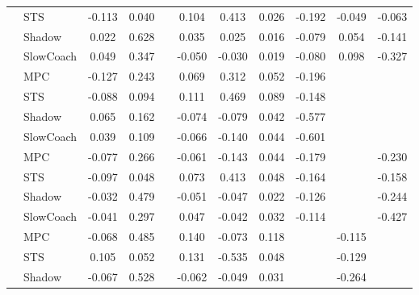\begin{tabular}{|l|l|*{9}{c|}}
                                                           & STS &   -0.113 &     0.040 &        &  0.104 &  0.413 &  0.026 &  -0.192 &  -0.049 &   -0.063 \\
                                                           & Shadow &    0.022 &     0.628 &        &  0.035 &  0.025 &  0.016 &  -0.079 &   0.054 &   -0.141 \\
                                                           & SlowCoach &    0.049 &     0.347 &        & -0.050 & -0.030 &  0.019 &  -0.080 &   0.098 &   -0.327 \\
\midrule
[True, True, False, True, True, True, True, False, False] & MPC &   -0.127 &     0.243 &        &  0.069 &  0.312 &  0.052 &  -0.196 &      &       \\
                                                           & STS &   -0.088 &     0.094 &        &  0.111 &  0.469 &  0.089 &  -0.148 &      &       \\
                                                           & Shadow &    0.065 &     0.162 &        & -0.074 & -0.079 &  0.042 &  -0.577 &      &       \\
                                                           & SlowCoach &    0.039 &     0.109 &        & -0.066 & -0.140 &  0.044 &  -0.601 &      &       \\
\midrule
[True, True, False, True, True, True, True, False, True] & MPC &   -0.077 &     0.266 &        & -0.061 & -0.143 &  0.044 &  -0.179 &      &   -0.230 \\
                                                           & STS &   -0.097 &     0.048 &        &  0.073 &  0.413 &  0.048 &  -0.164 &      &   -0.158 \\
                                                           & Shadow &   -0.032 &     0.479 &        & -0.051 & -0.047 &  0.022 &  -0.126 &      &   -0.244 \\
                                                           & SlowCoach &   -0.041 &     0.297 &        &  0.047 & -0.042 &  0.032 &  -0.114 &      &   -0.427 \\
\midrule
[True, True, False, True, True, True, False, True, False] & MPC &   -0.068 &     0.485 &        &  0.140 & -0.073 &  0.118 &      &  -0.115 &       \\
                                                           & STS &    0.105 &     0.052 &        &  0.131 & -0.535 &  0.048 &      &  -0.129 &       \\
                                                           & Shadow &   -0.067 &     0.528 &        & -0.062 & -0.049 &  0.031 &      &  -0.264 &       \\

\end{tabular}
